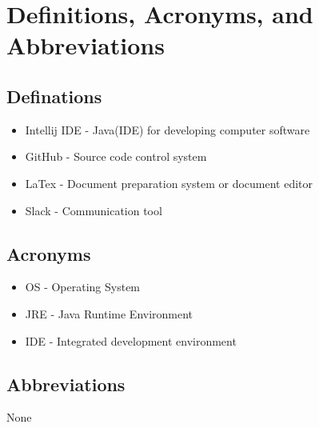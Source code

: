\section{ Definitions, Acronyms, and Abbreviations}

\subsection{Definations}
\begin{itemize}
\item Intellij IDE - Java(IDE) for developing computer software
\item GitHub - Source code control system
\item LaTex - Document preparation system or document editor 
\item Slack - Communication tool
\end{itemize}

\subsection{Acronyms}
\begin{itemize}
\item OS - Operating System
\item JRE - Java Runtime Environment
\item IDE - Integrated development environment
\end{itemize}

\subsection{Abbreviations}
None
